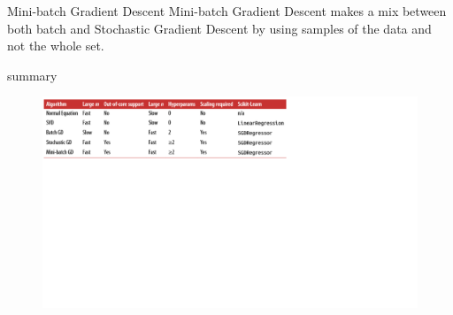 \documentclass{beamer}
\begin{document}
\begin{frame}{Mini-batch Gradient Descent }
Mini-batch Gradient Descent  makes a mix between both batch and Stochastic Gradient Descent by using samples of the data and not the whole set.
\end{frame}
\begin{frame}{summary}
\begin{figure}
\begin{center}
\centering
  \includegraphics[totalheight=1\textheight]{Gradient Descent.png}
\end{center}
\end{figure}
\end{frame}
\end{document}
